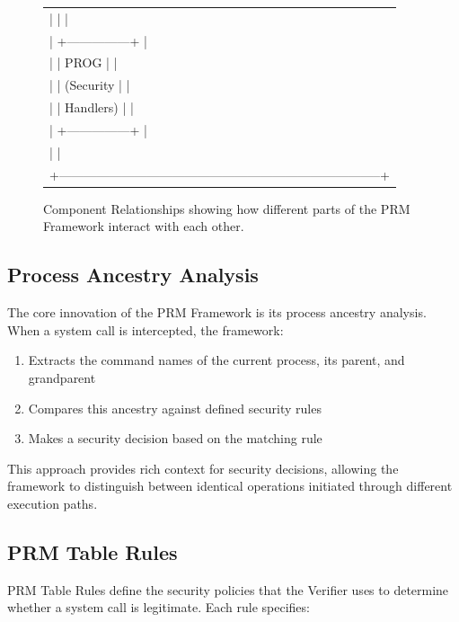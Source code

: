 \documentclass[conference]{IEEEtran}
\begin{document}
\begin{figure}[htbp]
{{{\begin{tabular}{l}
|                                                 |                           | \\
|                                         +---------------+                   | \\
|                                         |  PROG         |                   | \\
|                                         |  (Security    |                   | \\
|                                         |   Handlers)   |                   | \\
|                                         +---------------+                   | \\
|                                                                             | \\
+-----------------------------------------------------------------------------+ \\
\end{tabular}
}
}}
\caption{Component Relationships showing how different parts of the PRM Framework interact with each other.}
\label{fig:components}
\end{figure}\subsection{Process Ancestry Analysis}
The core innovation of the PRM Framework is its process ancestry analysis. When a system call is intercepted, the framework:

\begin{enumerate}
\item Extracts the command names of the current process, its parent, and grandparent
\item Compares this ancestry against defined security rules
\item Makes a security decision based on the matching rule
\end{enumerate}

This approach provides rich context for security decisions, allowing the framework to distinguish between identical operations initiated through different execution paths.

\subsection{PRM Table Rules}
PRM Table Rules define the security policies that the Verifier uses to determine whether a system call is legitimate. Each rule specifies:
\end{document}
